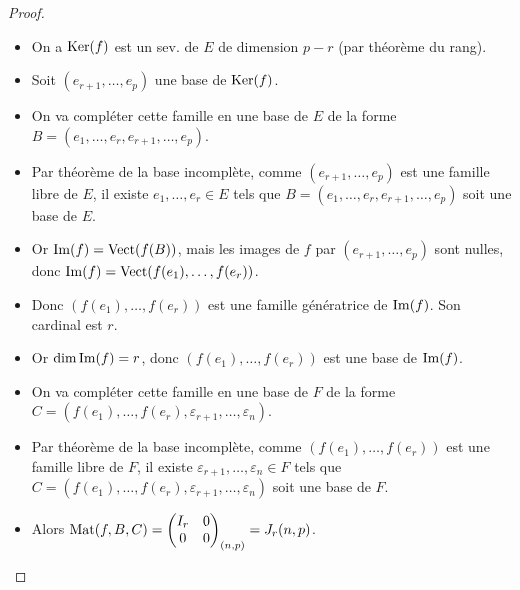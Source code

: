 \documentclass[12pt,a4paper]{report}
\begin{document}
\begin{proof}
    \begin{itemize}
        \item On a $\mathrm{Ker}(f)$ est un sev. de $E$ de dimension $p-r$ (par théorème du rang).

        \item Soit $(e_{r+1}, \dots, e_p)$ une base de $\mathrm{Ker}(f)$.

        \item On va compléter cette famille en une base de $E$ de la forme $B = (e_1, \dots, e_r, e_{r+1}, \dots, e_p)$.

        \item Par théorème de la base incomplète, comme $(e_{r+1}, \dots, e_p)$ est une famille libre de $E$, il existe $e_1, \dots, e_r \in E$ tels que $B = (e_1, \dots, e_r, e_{r+1}, \dots, e_p)$ soit une base de $E$.
        
        \item Or $\mathrm{Im}(f) = \mathrm{Vect}(f(B))$, mais les images de $f$ par $(e_{r+1}, \dots, e_p)$ sont nulles, donc $\mathrm{Im}(f) = \mathrm{Vect}(f(e_1), \dots, f(e_r))$.
        \item Donc $(f(e_1), \dots, f(e_r))$ est une famille génératrice de $\mathrm{Im}(f)$. Son cardinal est $r$.
        \item Or $\dim \mathrm{Im}(f) = r$, donc $(f(e_1), \dots, f(e_r))$ est une base de $\mathrm{Im}(f)$.
        \item On va compléter cette famille en une base de $F$ de la forme $C = (f(e_1), \dots, f(e_r), \varepsilon_{r+1}, \dots, \varepsilon_n)$.
        \item Par théorème de la base incomplète, comme $(f(e_1), \dots, f(e_r))$ est une famille libre de $F$, il existe $\varepsilon_{r+1}, \dots, \varepsilon_n \in F$ tels que $C = (f(e_1), \dots, f(e_r), \varepsilon_{r+1}, \dots, \varepsilon_n)$ soit une base de $F$.
        \item Alors $\mathrm{Mat}(f,B,C) = \left(\begin{matrix} I_r & 0 \\ 0 & 0 \end{matrix}\right)_{(n,p)} = J_r(n,p)$.
        

\end{itemize}
\end{proof}
\end{document}
